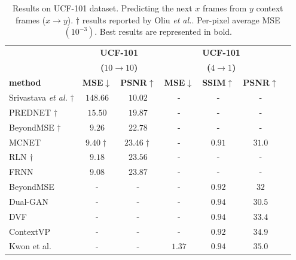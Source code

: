 \begin{table}[!t] 
	\centering
	\footnotesize
	\caption{Results on UCF-101 dataset. Predicting the next $x$ frames from $y$ context frames ($x\rightarrow y$). $\dag$ results reported by Oliu \textit{et al.}\cite{Oliu2018}. Per-pixel average \ac{MSE} $(10^{-3})$. Best results are represented in bold.}
	\label{table:results_ucf101}
	\begin{tabular} {@{}lcccccc@{}} 
		\toprule
		& \multicolumn{2}{c}{\textbf{UCF-101}} & \multicolumn{3}{c}{\textbf{UCF-101}}\\ 
		& \multicolumn{2}{c}{\textbf{($10\rightarrow10$)}} & \multicolumn{3}{c}{\textbf{($4\rightarrow1$)}}\\ 
		\cmidrule{2-3} \cmidrule(l){4-6} 
		\textbf{method} & \textbf{\ac{MSE}}$\downarrow$ & \textbf{\ac{PSNR}}$\uparrow$ & \textbf{\ac{MSE}}$\downarrow$ & \textbf{\ac{SSIM}}$\uparrow$ & \textbf{\ac{PSNR}}$\uparrow$ \\
		\midrule
		Srivastava \textit{et al.} \cite{Srivastava2015}$\dag$ & $148.66$ & $10.02$ & - & - & - \\
		\ac{PREDNET} \cite{Lotter2017}$\dag$ & $15.50$ & $19.87$ & - & - & -\\
		BeyondMSE \cite{Mathieu2016}$\dag$ & $9.26$ & $22.78$ & - & - & -\\ 
		\ac{MCNET} \cite{Villegas2017a}& $9.40\dag$ & $23.46\dag$ & - & $0.91$ & $31.0$ \\
		\acs{RLN} \cite{Premont-Schwarz2017}$\dag$ & $9.18$ & $23.56$ & - & - & -\\
		\acs{FRNN} \cite{Oliu2018} & $\mathbf{9.08}$ & $\mathbf{23.87}$ & - & - & -\\
		BeyondMSE \cite{Mathieu2016} & - & - & - & $0.92$ & $32$ \\ 
		Dual-GAN \cite{Liang2017} & - & - & - & $\mathbf{0.94}$ & $30.5$ \\
		\ac{DVF} \cite{Liu2017} & - & - & - & $\mathbf{0.94}$ & $33.4$ \\ 
		ContextVP \cite{Byeon2018} & - & - & - & $0.92$ & $34.9$ \\
		Kwon et al. \cite{Kwon2019} & - & - & $\mathbf{1.37}$ & $\mathbf{0.94}$ & $\mathbf{35.0}$ \\
		\bottomrule
	\end{tabular}
\end{table}

